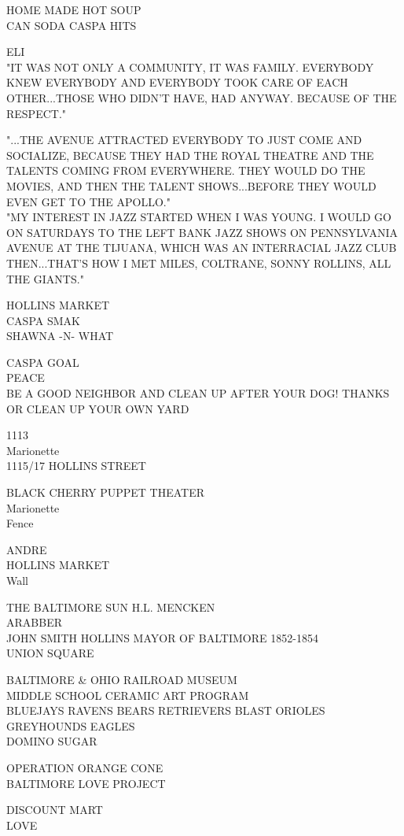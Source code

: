 \documentclass[10pt,letterpaper]{article}
\begin{document}
HOME MADE HOT SOUP\\
CAN SODA CASPA HITS

ELI\\
"IT WAS NOT ONLY A COMMUNITY, IT WAS FAMILY.  EVERYBODY KNEW EVERYBODY AND EVERYBODY TOOK CARE OF EACH OTHER...THOSE WHO DIDN'T HAVE, HAD ANYWAY.  BECAUSE OF THE RESPECT."

"...THE AVENUE ATTRACTED EVERYBODY TO JUST COME AND SOCIALIZE, BECAUSE THEY HAD THE ROYAL THEATRE AND THE TALENTS COMING FROM EVERYWHERE.  THEY WOULD DO THE MOVIES, AND THEN THE TALENT SHOWS...BEFORE THEY WOULD EVEN GET TO THE APOLLO."\\
"MY INTEREST IN JAZZ STARTED WHEN I WAS YOUNG.  I WOULD GO ON SATURDAYS TO THE LEFT BANK JAZZ SHOWS ON PENNSYLVANIA AVENUE AT THE TIJUANA, WHICH WAS AN INTERRACIAL JAZZ CLUB THEN...THAT'S HOW I MET MILES, COLTRANE, SONNY ROLLINS, ALL THE GIANTS."

HOLLINS MARKET\\
CASPA SMAK\\
SHAWNA {-}N{-} WHAT

CASPA GOAL\\
PEACE\\
BE A GOOD NEIGHBOR AND CLEAN UP AFTER YOUR DOG! THANKS OR CLEAN UP YOUR OWN YARD

1113\\
Marionette\\
1115/17 HOLLINS STREET

BLACK CHERRY PUPPET THEATER\\
Marionette\\
Fence

ANDRE\\
HOLLINS MARKET\\
Wall

THE BALTIMORE SUN H.L. MENCKEN\\
ARABBER\\
JOHN SMITH HOLLINS MAYOR OF BALTIMORE 1852{-}1854\\
UNION SQUARE

BALTIMORE \& OHIO RAILROAD MUSEUM\\
MIDDLE SCHOOL CERAMIC ART PROGRAM\\
BLUEJAYS RAVENS BEARS RETRIEVERS BLAST ORIOLES GREYHOUNDS EAGLES\\
DOMINO SUGAR

OPERATION ORANGE CONE\\
BALTIMORE LOVE PROJECT

DISCOUNT MART\\
LOVE
\end{document}
